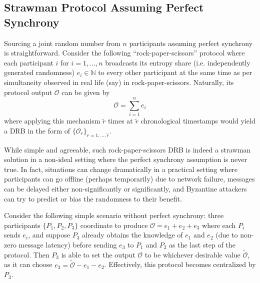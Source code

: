 \documentclass[letterpaper,twocolumn,10pt]{article}
\theoremstyle{definition}
\theoremstyle{remark}
\begin{document}
\subsection{Strawman Protocol Assuming Perfect Synchrony}
Sourcing a joint random number from $n$ participants assuming perfect synchrony is straightforward. Consider the following ``rock-paper-scissors'' protocol where each participant $i$ for $i = 1, ..., n$ broadcasts its entropy share (i.e. independently generated randomness) $e_i \in \mathbb{N}$ to every other participant at the same time as per simultaneity observed in real life (say) in rock-paper-scissors. Naturally, its protocol output $\mathcal{O}$ can be given by
\[
\mathcal{O} = \sum_{i = 1}^n e_i
\]
where applying this mechanism $\tilde{r}$ times at $\tilde{r}$ chronological timestamps would yield a DRB in the form of $\{\mathcal{O}_r\}_{r = 1, ..., \tilde{r}}$.

While simple and agreeable, such rock-paper-scissors DRB is indeed a strawman solution in a non-ideal setting where the perfect synchrony assumption is never true. In fact, situations can change dramatically in a practical setting where participants can go offline (perhaps temporarily) due to network failure, messages can be delayed either non-significantly or significantly, and Byzantine attackers can try to predict or bias the randomness to their benefit.

Consider the following simple scenario without perfect synchrony: three participants $\{P_1, P_2, P_3\}$ coordinate to produce $\mathcal{O} = e_1 + e_2 + e_3$ where each $P_i$ sends $e_i$, and suppose $P_3$ already obtains the knowledge of $e_1$ and $e_2$ (due to non-zero message latency) before sending $e_3$ to $P_1$ and $P_2$ as the last step of the protocol. Then $P_3$ is able to set the output $\mathcal{O}$ to be whichever desirable value $\widetilde{\mathcal{O}}$, as it can choose $e_3 = \widetilde{\mathcal{O}} - e_1 - e_2$. Effectively, this protocol becomes centralized by $P_3$.
\end{document}
